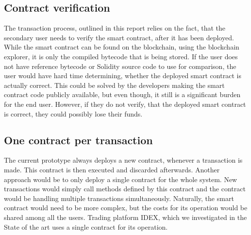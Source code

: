 \subsection{Contract verification}
The transaction process, outlined in this report relies on the fact, that the secondary user needs to verify the smart contract, after it has been deployed. While the smart contract can be found on the blockchain, using the blockchain explorer, it is only the compiled bytecode that is being stored. If the user does not have reference bytecode or Solidity source code to use for comparison, the user would have hard time determining, whether the deployed smart contract is actually correct. This could be solved by the developers making the smart contract code publicly available, but even though, it still is a significant burden for the end user. However, if they do not verify, that the deployed smart contract is correct, they could possibly lose their funds.

\subsection{One contract per transaction}
The current prototype always deploys a new contract, whenever a transaction is made. This contract is then executed and discarded afterwards. Another approach would be to only deploy a single contract for the whole system. New transactions would simply call methods defined by this contract and the contract would be handling multiple transactions simultaneously. Naturally, the smart contract would need to be more complex, but the costs for its operation would be shared among all the users. Trading platform IDEX, which we investigated in the State of the art uses a single contract for its operation.
